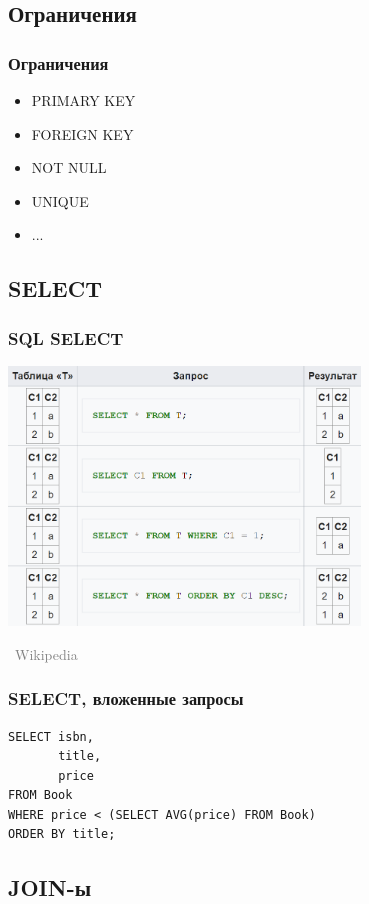 \documentclass[xetex,mathserif,serif]{beamer}
\newcommand{\attribution}[1] {
\vspace{-5mm}\begin{flushright}\begin{scriptsize}\textcolor{gray}{\textcopyright\, #1}\end{scriptsize}\end{flushright}
}
\begin{document}
	\subsection{Ограничения}

	\begin{frame}
		\frametitle{Ограничения}
		\begin{itemize}
			\item PRIMARY KEY
			\item FOREIGN KEY
			\item NOT NULL
			\item UNIQUE
			\item ...
		\end{itemize}
	\end{frame}

	\subsection{SELECT}

	\begin{frame}
		\frametitle{SQL SELECT}
		\begin{center}
			\includegraphics[width=0.7\textwidth]{select.png}
			\attribution{Wikipedia}
		\end{center}
	\end{frame}

	\begin{frame}[fragile]
		\frametitle{SELECT, вложенные запросы}
		\begin{verbatim}
SELECT isbn,
       title,
       price
FROM Book
WHERE price < (SELECT AVG(price) FROM Book)
ORDER BY title;
		\end{verbatim}
	\end{frame}

	\subsection{JOIN-ы}
\end{document}
